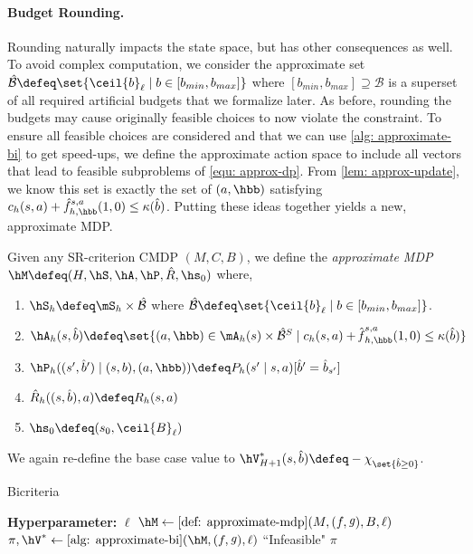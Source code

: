\documentclass[pdftex, a4paper, 12pt]{article}
\newcommand{\jeremy}[1]{\textcolor{red}{#1}}
\newcommand{\round}[2]{\ceil{#2}_{#1}}
\newcommand{\mB}{\mathcal{B}}
\newcommand{\hb}{\hat{b}}
\newcommand{\hB}{\hat{\mathcal{B}}}
\newcommand{\bmax}{b_{max}}
\newcommand{\bmin}{b_{min}}
\newcommand{\hR}{\hat{R}}
\newcommand{\hf}{\hat{f}}
\DeclareMathOperator*{\f}{\mathit{f}}
\DeclareMathOperator*{\g}{\mathit{g}}
\begin{document}

\paragraph{Budget Rounding.} Rounding naturally impacts the state space, but has other consequences as well. To avoid complex computation, we consider the approximate set $\hB \defeq \set{\round{\ell}{b} \mid b \in [\bmin, \bmax]}$ where $[\bmin, \bmax] \supseteq \mB$ is a superset of all required artificial budgets that we formalize later. As before, rounding the budgets may cause originally feasible choices to now violate the constraint. To ensure all feasible choices are considered and that we can use \cref{alg: approximate-bi} to get speed-ups, we define the approximate action space to include all vectors that lead to feasible subproblems of \eqref{equ: approx-dp}. From \cref{lem: approx-update}, we know this set is exactly the set of $(a, \hbb)$ satisfying $c_h(s,a) + \hf_{h,\hbb}^{s,a}(1,0) \leq \kappa(\hb)$. Putting these ideas together yields a new, approximate MDP.  



\begin{definition}\label{def: approximate-mdp}
    
    Given any SR-criterion CMDP $(M, C, B)$, we define
    the \emph{approximate MDP} $\hM \defeq (H, \hS, \hA, \hP, \hR, \hs_0)$ where,
    \begin{enumerate}
        \item $\hS_h \defeq \mS_h \times \hB$ where $\hB \defeq \set{\round{\ell}{b} \mid b \in [\bmin, \bmax]}$.
        \item $\hA_h(s, \hb) \defeq \set{(a,\hbb) \in \mA_h(s) \times \hB^{S} \mid c_h(s,a) + \hat{\f}_{h, \hbb}^{s,a}(1, 0) \leq \kappa(\hb)}$
        \item $\hP_h((s', \hb') \mid (s,b), (a, \hbb)) \defeq P_h(s' \mid s,a)[\hb' = \hb_{s'}]$
        \item $\hR_h((s,\hb), a) \defeq R_h(s,a)$
        \item $\hs_0 \defeq (s_0, \round{\ell}{B})$
    \end{enumerate}
    We again re-define the base case value to $\hV^*_{H+1}(s,\hb) \defeq -\chi_{\set{\hb \geq 0}}$.
\end{definition}

\begin{algorithm}[t]
    \caption{Bicriteria}\label{alg: bicriteria}
    \begin{algorithmic}[1]
        \State \textbf{Hyperparameter:} $\ell$ 
        \State $\hM \gets \text{\cref{def: approximate-mdp}}(M, (f,\g), B, \ell)$
        \State $\pi, \hV^* \gets \text{\cref{alg: approximate-bi}}(\hM, (f,\g), \ell)$
        \If{$\hV^*_1(s_0,\round{\ell}{B}) = -\infty$}
            \State \Return ``Infeasible"
        \Else 
            \State \Return $\pi$
        \EndIf
    \end{algorithmic}
\end{algorithm}
\end{document}
